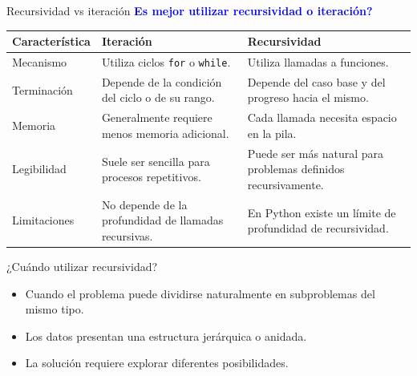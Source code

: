 \documentclass{beamer}
\begin{document}
    \begin{frame}[fragile, t]{Recursividad vs iteración}
        \textcolor{blue}{\textbf{Es mejor utilizar recursividad o iteración?}}
        \vspace{0.5em}
        \renewcommand{\arraystretch}{1.3}
        \begin{center}
            \footnotesize
            \begin{tabular}{@{}p{2.2cm}p{4.2cm}p{4.2cm}@{}}
                \toprule
                \textbf{Característica} & \textbf{Iteración} & \textbf{Recursividad} \\
                \midrule
                Mecanismo &
                Utiliza ciclos \texttt{for} o \texttt{while}. &
                Utiliza llamadas a funciones. \\
                Terminación &
                Depende de la condición del ciclo o de su rango. &
                Depende del caso base y del progreso hacia el mismo. \\
                Memoria &
                Generalmente requiere menos memoria adicional. &
                Cada llamada necesita espacio en la pila. \\
                Legibilidad &
                Suele ser sencilla para procesos repetitivos. &
                Puede ser más natural para problemas definidos recursivamente. \\
                Limitaciones &
                No depende de la profundidad de llamadas recursivas. &
                En Python existe un límite de profundidad de recursividad. \\
                \bottomrule
            \end{tabular}
        \end{center}
    \end{frame}

    \begin{frame}[fragile, t]{¿Cuándo utilizar recursividad?}
        \begin{itemize}
            \item Cuando el problema puede dividirse naturalmente en subproblemas del mismo tipo.
            \item Los datos presentan una estructura jerárquica o anidada.
            \item La solución requiere explorar diferentes posibilidades.
        \end{itemize}
    \end{frame}
\end{document}
